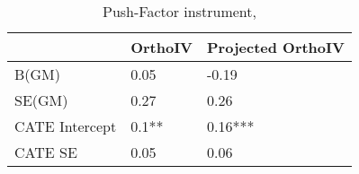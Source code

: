 \begin{table}\centering\caption{Push-Factor instrument, }\begin{tabular}{lll}
\toprule
                & OrthoIV   & Projected OrthoIV   \\
\midrule
 B(GM)          & 0.05      & -0.19               \\
 SE(GM)         & 0.27      & 0.26                \\
 CATE Intercept & 0.1**     & 0.16***             \\
 CATE SE        & 0.05      & 0.06                \\
\bottomrule
\end{tabular}\end{table}